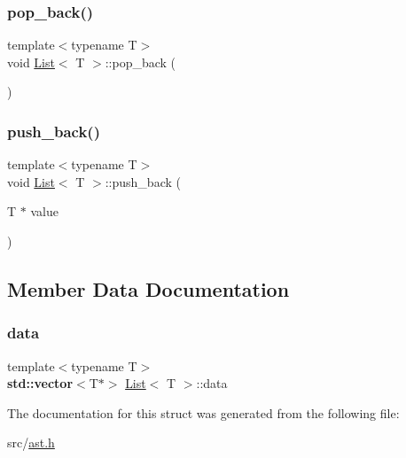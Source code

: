 \subsubsection{\texorpdfstring{pop\+\_\+back()}{pop\_back()}}
{\footnotesize\ttfamily template$<$typename T$>$ \\
void \hyperlink{struct_list}{List}$<$ T $>$\+::pop\+\_\+back (\begin{DoxyParamCaption}{ }\end{DoxyParamCaption})\hspace{0.3cm}{\ttfamily [inline]}}

\mbox{\label{struct_list_af4ca3dd63fcff83845b673dfd7d5d715}} 
\subsubsection{\texorpdfstring{push\+\_\+back()}{push\_back()}}
{\footnotesize\ttfamily template$<$typename T$>$ \\
void \hyperlink{struct_list}{List}$<$ T $>$\+::push\+\_\+back (\begin{DoxyParamCaption}\item[{T $\ast$}]{value }\end{DoxyParamCaption})\hspace{0.3cm}{\ttfamily [inline]}}



\subsection{Member Data Documentation}
\mbox{\label{struct_list_a63c9cd234577800ed4664dcefebba10e}} 
\subsubsection{\texorpdfstring{data}{data}}
{\footnotesize\ttfamily template$<$typename T$>$ \\
\textbf{ std\+::vector}$<$T$\ast$$>$ \hyperlink{struct_list}{List}$<$ T $>$\+::data}



The documentation for this struct was generated from the following file\+:\begin{DoxyCompactItemize}
\item 
src/\hyperlink{ast_8h}{ast.\+h}\end{DoxyCompactItemize}

